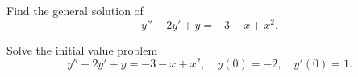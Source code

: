 \setcounter{example}{1}
\setcounter{equation}{9}
\begin{example}
  \label{example:5.3.2} \rm \mbox{}
  \newline %
  \begin{alist}
    \item %
    Find the general solution of
    \begin{equation}
      \label{eq:5.3.10}y''-2y'+y=-3-x+x^{2}.
    \end{equation}

    \item %
    Solve the initial value problem
    \begin{equation}
      \label{eq:5.3.11}y''-2y'+y=-3-x+x^{2},\quad y(0)=-2,\quad y'(0)=1.
    \end{equation}
  \end{alist}
\end{example}
\setcounter{equation}{11}
\setcounter{figure}{1}
